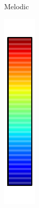 \documentclass{article} %
\begin{document}
\begin{figure}
\begin{preview}
\begin{subfigure}[b]{.3\linewidth}
	\vspace*{-1.8em}
        \caption*{\sffamily Melodic}
      \end{subfigure}
      \begin{subfigure}[b]{.06\linewidth}
        \includegraphics[width=\linewidth]{colorbar}%
	\vspace*{-1.8em}
        \caption*{}
      \end{subfigure}
\end{preview}
\end{figure}
\end{document}
